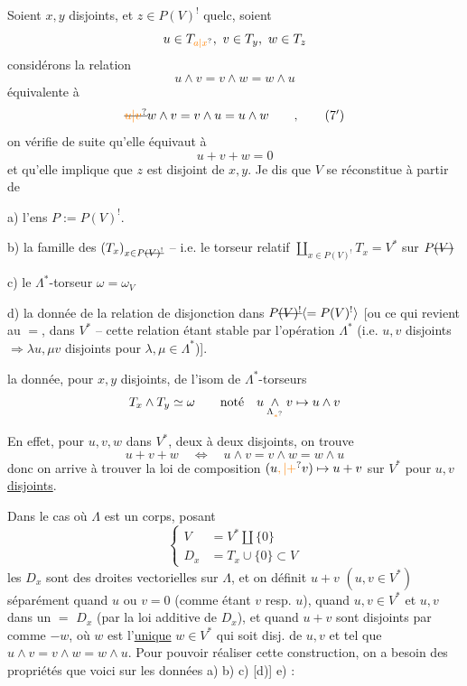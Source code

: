 Soient $x,y$  disjoints, et $z\in P(V)^!$ quelc, soient
\[
u\in T_{\unsure{a|x}},\ v\in T_y,\ w\in T_z
\]
considérons la relation
\[
u\wedge v=v\wedge w=w\wedge u
\tag*{(7)}
\]
équivalente à
\[
\deleted{\unsure{u|v}}w\wedge v=v\wedge u=u\wedge w\qquad,
\tag*{(7$'$)}
\]
on vérifie de suite qu'elle équivaut à
\[
u+v+w=0
\tag*{(8)}
\]
et qu'elle implique que $z$ est disjoint de $x,y$.
Je dis que  $V$ se réconstitue  à partir de

a) l'ens $P:=P(V)^!$.

b) la famille des  $(T_x)_{x\in P\deleted{(V)^!}}$ -- i.e. le torseur relatif $\coprod_{x\in P(V)^!} T_x=V^*$ sur $P\deleted{(V)}$

c) le $\Lambda^*$-torseur $\omega=\omega_V$

d) la donnée de la relation de disjonction dans $P\deleted{(V)^!}\inserted{=P(V)^!}$ [ou ce qui revient au $=$, dans $V^*$ -- cette relation étant stable par l'opération $\Lambda^*$ (i.e. $u,v$ disjoints $\Rightarrow\lambda u,\mu v$ disjoints pour $\lambda,\mu\in\Lambda^*$)].
\margin{Si $\Lambda$ est un corps, cette relation est la relation triviale $x\ne y$, et ne demande pas de donnée suppl. $\big[$}


 la donnée, pour $x,y$ disjoints, de l'isom de $\Lambda^*$-torseurs
\[
T_x\wedge T_y\simeq\omega\qquad\text{noté}\quad
u\mathbin{\underset{\Lambda_{\unsure{*}}}{\wedge}}v\mapsto u\wedge v
\]

En effet, pour  $u,v,w$ dans $V^*$, deux à deux disjoints, on trouve
\[
u+v+w\quad\Longleftrightarrow\quad u\wedge v=v\wedge w=w\wedge u
\]
donc on arrive à trouver la loi de composition  $(u\unsure{,|+}v)\mapsto u+v$ sur $V^*$ pour $u,v$ \uline{disjoints}.

 Dans le cas où $\Lambda$ est un corps, posant
\[
\left\{\begin{aligned}
V&=V^*\amalg\{0\}\\
D_x&=T_x\cup\{0\}\subset V
\end{aligned}\right.
\]
les $D_x$ sont des droites vectorielles sur $\Lambda$, et on
définit $u+v$ $(u,v\in V^*)$ séparément quand $u$ ou $v=0$ (comme étant $v$ resp. $u$), quand $u,v\in V^*$ et $u,v$ dans un $=$ $D_x$ (par la loi additive de $D_x$), et quand $u+v$ sont disjoints par  comme $-w$, où $w$ est l'\uline{unique} $w\in V^*$ qui soit disj. de $u,v$ et tel que $u\wedge v=v\wedge w=w\wedge u$. Pour pouvoir réaliser cette construction, on a besoin des  propriétés que voici sur les données a) b) c) [d)] e) :

